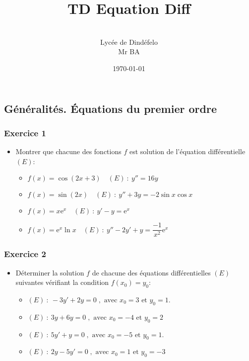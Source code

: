 \documentclass[12pt]{article}
\author{\\Lycée de Dindéfelo\\Mr BA}
\title{\textbf{TD Equation Diff}}
\date{\today}
\begin{document}
\maketitle
\newpage
\subsection*{Généralités. Équations du premier ordre}
\subsubsection*{Exercice 1}
\begin{itemize}
    \item Montrer que chacune des fonctions \(f\) est solution de l'équation différentielle \((E)\):
    \begin{itemize}
        \item \(f(x)=\cos(2x+3)\quad(E)\ :\  y''=16y\)
        \item \(f(x)=\sin(2x)\quad(E)\ :\  y''+3y=-2\sin x\cos x\)
        \item \(f(x)=x\mathrm{e}^{x}\quad(E)\ :\  y'-y=\mathrm{e}^{x}\)
        \item \(f(x)=\mathrm{e}^{x}\ln x\quad(E)\ :\  y''-2y'+y=\dfrac{-1}{x^{2}}\mathrm{e}^{x}\)
    \end{itemize}
\end{itemize}
\subsubsection*{Exercice 2}
\begin{itemize}
    \item Déterminer la solution \(f\) de chacune des équations différentielles \((E)\) suivantes vérifiant la condition \(f(x_{0})=y_{0}\):
    \begin{itemize}
        \item \((E)\ :\ -3y'+2y=0\;,\text{ avec }x_{0}=3\text{ et }y_{0}=1.\)
        \item \((E)\ :\ 3y+6y=0\;,\text{ avec }x_{0}=-4\text{ et }y_{0}=2\)
        \item \((E)\ :\ 5y'+y=0\;,\text{ avec }x_{0}=-5\text{ et }y_{0}=1.\)
        \item \((E)\ :\ 2y-5y'=0\;,\text{ avec }x_{0}=1\text{ et }y_{0}=-3\)
    \end{itemize}
\end{itemize}
\end{document}
